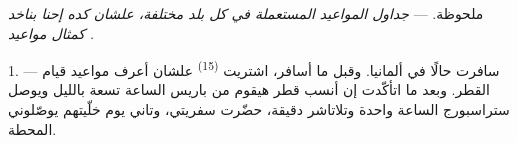 %
%
%
%
%
%
%
%
%

\VUsaut{4.0mm}
\VUsaut{2.4mm}
\VUsaut{3.4mm}
\textsc{ملحوظة.} --- \textit{جداول المواعيد المستعملة في كل بلد مختلفة، علشان كده
إحنا بناخد كمثال مواعيد} \textit{.}

1. --- سافرت حالًا في ألمانيا. وقبل ما أسافر، اشتريت 
\textsuperscript{(15)} علشان أعرف مواعيد قيام القطر. وبعد ما اتأكّدت إن أنسب قطر
هيقوم من باريس الساعة تسعة بالليل ويوصل ستراسبورج الساعة واحدة وتلاتاشر دقيقة،
حضّرت سفريتي، وتاني يوم خلّيتهم يوصّلوني المحطة.


